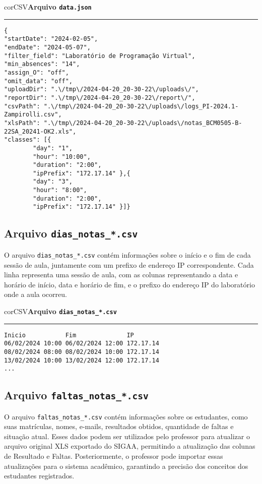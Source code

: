 \begin{myboxCode}{corCSV}{\textbf{Arquivo \texttt{data.json}}}\vspace{3mm}
\hrule
\begin{verbatim}
{
"startDate": "2024-02-05",
"endDate": "2024-05-07",
"filter_field": "Laboratório de Programação Virtual",
"min_absences": "14",
"assign_O": "off",
"omit_data": "off",
"uploadDir": ".\/tmp\/2024-04-20_20-30-22\/uploads\/",
"reportDir": ".\/tmp\/2024-04-20_20-30-22\/report\/",
"csvPath": ".\/tmp\/2024-04-20_20-30-22\/uploads\/logs_PI-2024.1-Zampirolli.csv",
"xlsPath": ".\/tmp\/2024-04-20_20-30-22\/uploads\/notas_BCM0505-B-22SA_20241-OK2.xls",
"classes": [{
        "day": "1",
        "hour": "10:00",
        "duration": "2:00",
        "ipPrefix": "172.17.14" },{
        "day": "3",
        "hour": "8:00",
        "duration": "2:00",
        "ipPrefix": "172.17.14" }]}
\end{verbatim}
\end{myboxCode}

\subsection{Arquivo \texttt{dias\_notas\_*.csv}}

O arquivo \texttt{dias\_notas\_*.csv} contém informações sobre o início e o fim de cada sessão de aula, juntamente com um prefixo de endereço IP correspondente. Cada linha representa uma sessão de aula, com as colunas representando a data e horário de início, data e horário de fim, e o prefixo do endereço IP do laboratório onde a aula ocorreu.

\begin{myboxCode}{corCSV}{\textbf{Arquivo \texttt{dias\_notas\_*.csv}}}\vspace{3mm}
    \hrule
    \begin{verbatim}
Inicio           Fim              IP
06/02/2024 10:00 06/02/2024 12:00 172.17.14
08/02/2024 08:00 08/02/2024 10:00 172.17.14
13/02/2024 10:00 13/02/2024 12:00 172.17.14
...
\end{verbatim}
\end{myboxCode}

\subsection{Arquivo \texttt{faltas\_notas\_*.csv}}

O arquivo \texttt{faltas\_notas\_*.csv} contém informações sobre os estudantes, como suas matrículas, nomes, e-mails, resultados obtidos, quantidade de faltas e situação atual. Esses dados podem ser utilizados pelo professor para atualizar o arquivo original XLS exportado do SIGAA, permitindo a atualização das colunas de Resultado e Faltas. Posteriormente, o professor pode importar essas atualizações para o sistema acadêmico, garantindo a precisão dos conceitos dos estudantes registrados.

